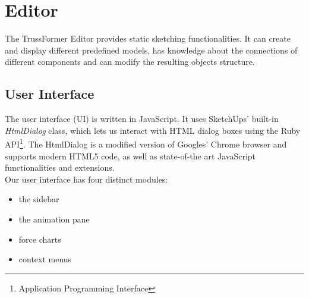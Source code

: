 \section{Editor}
The TrussFormer Editor provides static sketching functionalities. It can create and display different predefined models, has knowledge about the connections of different components and can modify the resulting objects structure.

\subsection{User Interface}
The user interface (UI) is written in JavaScript. It uses SketchUps' built-in \textit{HtmlDialog} class, which lets us interact with HTML dialog boxes using the Ruby API\footnote{Application Programming Interface}. The HtmlDialog is a modified version of Googles' Chrome browser and supports modern HTML5 code, as well as state-of-the art JavaScript functionalities and extensions.\\
Our user interface has four distinct modules:
\begin{itemize}
    \item the sidebar
    \item the animation pane
    \item force charts
    \item context menus
\end{itemize}

